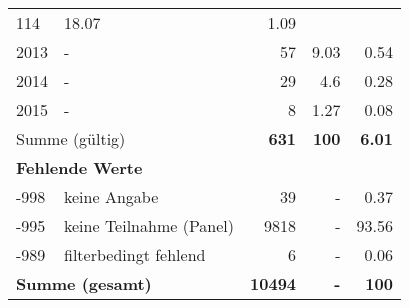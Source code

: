 \begin{longtable}{lXrrr}
       \num{114} &
       \num[round-mode=places,round-precision=2]{18.07} &
         \num[round-mode=places,round-precision=2]{1.09} \\

     2013 &
     \multicolumn{1}{X}{ -  } &


       \num{57} &
       \num[round-mode=places,round-precision=2]{9.03} &
         \num[round-mode=places,round-precision=2]{0.54} \\

     2014 &
     \multicolumn{1}{X}{ -  } &


       \num{29} &
       \num[round-mode=places,round-precision=2]{4.6} &
         \num[round-mode=places,round-precision=2]{0.28} \\

     2015 &
     \multicolumn{1}{X}{ -  } &


       \num{8} &
       \num[round-mode=places,round-precision=2]{1.27} &
         \num[round-mode=places,round-precision=2]{0.08} \\
     \midrule
     \multicolumn{2}{l}{Summe (gültig)} &
       \textbf{\num{631}} &
     \textbf{\num{100}} &
       \textbf{\num[round-mode=places,round-precision=2]{6.01}} \\
     \multicolumn{5}{l}{\textbf{Fehlende Werte}}\\
       -998 &
       keine Angabe &
         \num{39} &
        - &
         \num[round-mode=places,round-precision=2]{0.37} \\
       -995 &
       keine Teilnahme (Panel) &
         \num{9818} &
        - &
         \num[round-mode=places,round-precision=2]{93.56} \\
       -989 &
       filterbedingt fehlend &
         \num{6} &
        - &
         \num[round-mode=places,round-precision=2]{0.06} \\
     \midrule
     \multicolumn{2}{l}{\textbf{Summe (gesamt)}} &
          \textbf{\num{10494}} &
        \textbf{-} &
        \textbf{\num{100}} \\
     \bottomrule
     \end{longtable}
     
